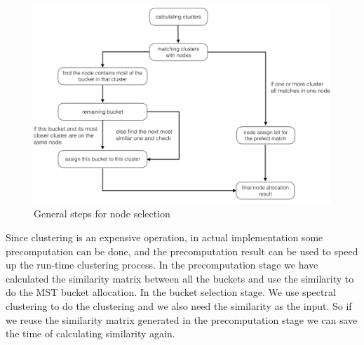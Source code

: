 \documentclass{vldb}
\begin{document}
\begin{figure}
\centering
\includegraphics[scale=0.18]{fig4}
\caption{General steps for node selection}
\label{fig:fig4}
\end{figure}
	Since clustering is an expensive operation, in actual implementation some precomputation can be done, and the precomputation result can be used to speed up the run-time clustering process. In the precomputation stage we have calculated the similarity matrix between all the buckets and use the similarity to do the MST bucket allocation. In the bucket selection stage. We use spectral clustering to do the clustering and we also need the similarity as the input. So if we reuse the similarity matrix generated in the precomputation stage we can save the time of calculating similarity again.
\end{document}
